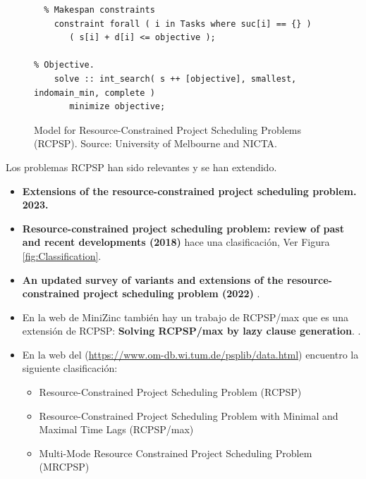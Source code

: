 \begin{figure}
    \begin{lstlisting}
  % Makespan constraints
    constraint forall ( i in Tasks where suc[i] == {} )
       ( s[i] + d[i] <= objective );
    
% Objective.
    solve :: int_search( s ++ [objective], smallest, indomain_min, complete )
       minimize objective;
\end{lstlisting}
\caption{Model for Resource-Constrained Project Scheduling Problems (RCPSP). Source: University of Melbourne and NICTA.}

\label{fig:Model-RCPSP-2}
\end{figure}


Los problemas RCPSP han sido relevantes y se han 
extendido.


\begin{itemize}

\item \textbf{Extensions of the resource-constrained project scheduling problem. 2023.}
\cite{DING2023104958}


    \item \textbf{Resource-constrained project scheduling problem: review of past and recent developments (2018)} \cite{habibi2018resource} hace una clasificación, Ver Figura \ref{fig:Classification}.

\item \textbf{An updated survey of variants and extensions of the resource-constrained project scheduling problem (2022)} \cite{hartmann2022updated}.

\item En la web de MiniZinc también hay un trabajo de RCPSP/max que es una extensión de RCPSP:
    \textbf{Solving RCPSP/max by lazy clause generation}. \cite{schutt2013solving}.  

\item En la web del (\url{https://www.om-db.wi.tum.de/psplib/data.html})  encuentro la siguiente clasificación:
    

\begin{itemize}
    \item Resource-Constrained Project Scheduling Problem (RCPSP)

    \item Resource-Constrained Project Scheduling Problem with Minimal and Maximal Time Lags (RCPSP/max)

    \item Multi-Mode Resource Constrained Project Scheduling Problem (MRCPSP)


\end{itemize}
\end{itemize}
